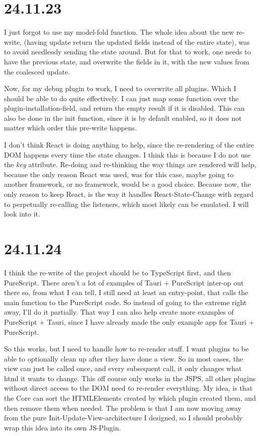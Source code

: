\section{24.11.23}

I just forgot to use my model-fold function. The whole idea about the new
re-write, (having update return the updated fields instead of the entire
state), was to avoid needlessly sending the state around. But for that to work,
one needs to have the previous state, and overwrite the fields in it, with the
new values from the coalesced update.

Now, for my debug plugin to work, I need to overwrite all plugins. Which I
should be able to do quite effectively. I can just map some function over the
plugin-installation-field, and return the empty result if it is disabled. This
can also be done in the init function, since it is by default enabled, so it
does not matter which order this pre-write happens.

I don't think React is doing anything to help, since the re-rendering of the
entire DOM happens every time the state changes. I think this is because I do
not use the \textit{key} attribute. Re-doing and re-thinking the way things are
rendered will help, because the only reason React was used, was for this case,
maybe going to another framework, or no framework, would be a good choice.
Because now, the only reason to keep React, is the way it handles
React-State-Change with regard to perpetually re-calling the listeners, which
most likely can be emulated. I will look into it.


\section{24.11.24}

I think the re-write of the project should be to TypeScript first, and then
PureScript. There aren't a lot of examples of Tauri + PureScript inter-op out
there so, from what I can tell, I still need at least an entry-point, that calls
the main function to the PureScript code. So instead of going to the extreme
right away, I'll do it partially. That way I can also help create more examples
of PureScript + Tauri, since I have already made the only example app for Tauri
+ PureScript.

So this works, but I need to handle how to re-render stuff. I want plugins to
be able to optionally clean up after they have done a view. So in most cases,
the view can just be called once, and every subsequent call, it only changes what
html it wants to change. This off course only works in the JSPS, all other
plugins without direct access to the DOM need to re-render everything. My idea,
is that the Core can sort the HTMLElements created by which plugin created them,
and then remove them when needed. The problem is that I am now moving away from
the pure Init-Update-View-architecture I designed, so I should probably wrap
this idea into its own JS-Plugin.

